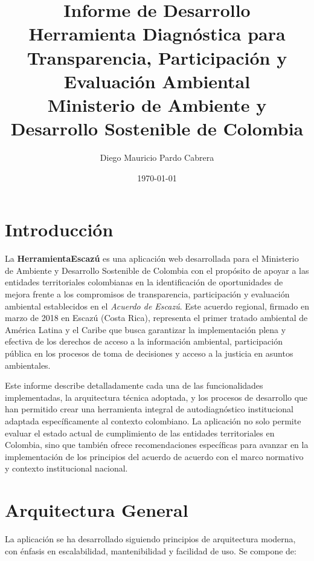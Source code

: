 \documentclass[12pt,a4paper]{report}
\title{\textbf{Informe de Desarrollo}\\[0.5cm]{\Large Herramienta Diagnóstica para Transparencia, Participación y Evaluación Ambiental}\\[0.5cm]{\normalsize Ministerio de Ambiente y Desarrollo Sostenible de Colombia}}
\author{Diego Mauricio Pardo Cabrera}
\date{\today}
\begin{document}
\maketitle
\tableofcontents
\newpage

\chapter{Introducción}
La \textbf{HerramientaEscazú} es una aplicación web desarrollada para el Ministerio de Ambiente y Desarrollo Sostenible de Colombia con el propósito de apoyar a las entidades territoriales colombianas en la identificación de oportunidades de mejora frente a los compromisos de transparencia, participación y evaluación ambiental establecidos en el \textit{Acuerdo de Escazú}. Este acuerdo regional, firmado en marzo de 2018 en Escazú (Costa Rica), representa el primer tratado ambiental de América Latina y el Caribe que busca garantizar la implementación plena y efectiva de los derechos de acceso a la información ambiental, participación pública en los procesos de toma de decisiones y acceso a la justicia en asuntos ambientales.

Este informe describe detalladamente cada una de las funcionalidades implementadas, la arquitectura técnica adoptada, y los procesos de desarrollo que han permitido crear una herramienta integral de autodiagnóstico institucional adaptada específicamente al contexto colombiano. La aplicación no solo permite evaluar el estado actual de cumplimiento de las entidades territoriales en Colombia, sino que también ofrece recomendaciones específicas para avanzar en la implementación de los principios del acuerdo de acuerdo con el marco normativo y contexto institucional nacional.

\chapter{Arquitectura General}
La aplicación se ha desarrollado siguiendo principios de arquitectura moderna, con énfasis en escalabilidad, mantenibilidad y facilidad de uso. Se compone de:
\end{document}

